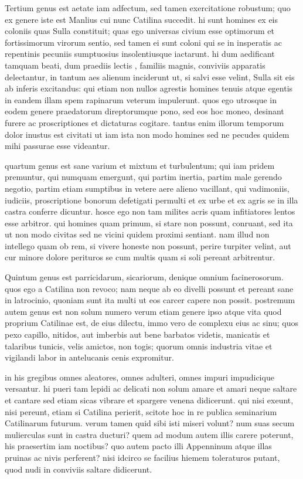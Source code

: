  Tertium genus est aetate iam adfectum, sed tamen exercitatione robustum; quo ex genere iste est Manlius cui nunc Catilina succedit. hi sunt homines ex eis coloniis quas Sulla constituit; quas ego universas civium esse optimorum et fortissimorum virorum sentio, sed tamen ei sunt coloni qui se in insperatis ac repentinis pecuniis sumptuosius insolentiusque iactarunt. hi dum aedificant tamquam beati, dum praediis lectis , familiis magnis, conviviis apparatis delectantur, in tantum aes alienum inciderunt ut, si salvi esse velint, Sulla sit eis ab inferis excitandus: qui etiam non nullos agrestis homines tenuis atque egentis in eandem illam spem rapinarum veterum impulerunt. quos ego utrosque in eodem genere praedatorum direptorumque pono, sed eos hoc moneo, desinant furere ac proscriptiones et dictaturas cogitare. tantus enim illorum temporum dolor inustus est civitati ut iam ista non modo homines sed ne pecudes quidem mihi passurae esse videantur.

 quartum genus est sane varium et mixtum et turbulentum; qui iam pridem premuntur, qui numquam emergunt, qui partim inertia, partim male gerendo negotio, partim etiam sumptibus in vetere aere alieno vacillant, qui vadimoniis, iudiciis, proscriptione bonorum defetigati permulti et ex urbe et ex agris se in illa castra conferre dicuntur. hosce ego non tam milites acris quam infitiatores lentos esse arbitror. qui homines quam primum, si stare non possunt, conruant, sed ita ut non modo civitas sed ne vicini quidem proximi sentiant. nam illud non intellego quam ob rem, si vivere honeste non possunt, perire turpiter velint, aut cur minore dolore perituros se cum multis quam si soli pereant arbitrentur.

 Quintum genus est parricidarum, sicariorum, denique omnium facinerosorum. quos ego a Catilina non revoco; nam neque ab eo divelli possunt et pereant sane in latrocinio, quoniam sunt ita multi ut eos carcer capere non possit. postremum autem genus est non solum numero verum etiam genere ipso atque vita quod proprium Catilinae est, de eius dilectu, immo vero de complexu eius ac sinu; quos pexo capillo, nitidos, aut imberbis aut bene barbatos videtis, manicatis et talaribus tunicis, velis amictos, non togis; quorum omnis industria vitae et vigilandi labor in antelucanis cenis expromitur.

 in his gregibus omnes aleatores, omnes adulteri, omnes impuri impudicique versantur. hi pueri tam lepidi ac delicati non solum amare et amari neque saltare et cantare sed etiam sicas vibrare et spargere venena didicerunt. qui nisi exeunt, nisi pereunt, etiam si Catilina perierit, scitote hoc in re publica seminarium Catilinarum futurum. verum tamen quid sibi isti miseri volunt? num suas secum mulierculas sunt in castra ducturi? quem ad modum autem illis carere poterunt, his praesertim iam noctibus? quo autem pacto illi Appenninum atque illas pruinas ac nivis perferent? nisi idcirco se facilius hiemem toleraturos putant, quod nudi in conviviis saltare didicerunt.

